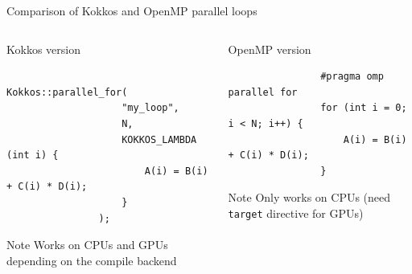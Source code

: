 \documentclass[aspectratio=169]{beamer}
\begin{document}

\begin{frame}[fragile]{Comparison of Kokkos and OpenMP parallel loops}
    \begin{columns}[T]
        \begin{column}{0.5\linewidth}
            Kokkos version

            \begin{verbatim}
                Kokkos::parallel_for(
                    "my_loop",
                    N,
                    KOKKOS_LAMBDA (int i) {
                        A(i) = B(i) + C(i) * D(i);
                    }
                );
            \end{verbatim}
            \begin{block}{Note}
                Works on CPUs and GPUs depending on the compile backend
            \end{block}
        \end{column}
        \begin{column}{0.5\linewidth}
            OpenMP version

            \begin{verbatim}
                #pragma omp parallel for
                for (int i = 0; i < N; i++) {
                    A(i) = B(i) + C(i) * D(i);
                }
            \end{verbatim}
            \begin{block}{Note}
                Only works on CPUs (need \texttt{target} directive for GPUs)
            \end{block}
        \end{column}
    \end{columns}
\end{frame}

\end{document}
